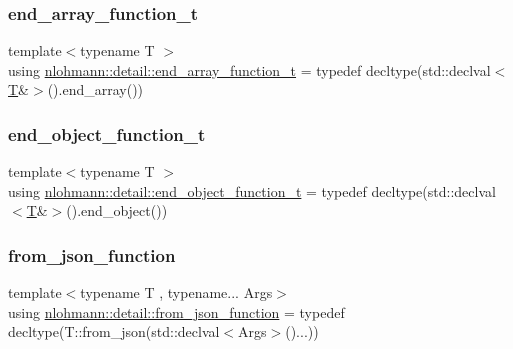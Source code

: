 \mbox{\label{namespacenlohmann_1_1detail_aec53c029383b34a72182210e58fadb79}} 
\subsubsection{\texorpdfstring{end\_array\_function\_t}{end\_array\_function\_t}}
{\footnotesize\ttfamily template$<$typename T $>$ \\
using \mbox{\hyperlink{namespacenlohmann_1_1detail_aec53c029383b34a72182210e58fadb79}{nlohmann\+::detail\+::end\+\_\+array\+\_\+function\+\_\+t}} = typedef decltype(std\+::declval$<$\mbox{\hyperlink{_keyboard_event_8h_adf1f3edb9115acb0a1e04209b7a9937b}{T}}\&$>$().end\+\_\+array())}

\mbox{\label{namespacenlohmann_1_1detail_af52d6d2521c386998ae940d118182ebc}} 
\subsubsection{\texorpdfstring{end\_object\_function\_t}{end\_object\_function\_t}}
{\footnotesize\ttfamily template$<$typename T $>$ \\
using \mbox{\hyperlink{namespacenlohmann_1_1detail_af52d6d2521c386998ae940d118182ebc}{nlohmann\+::detail\+::end\+\_\+object\+\_\+function\+\_\+t}} = typedef decltype(std\+::declval$<$\mbox{\hyperlink{_keyboard_event_8h_adf1f3edb9115acb0a1e04209b7a9937b}{T}}\&$>$().end\+\_\+object())}

\mbox{\label{namespacenlohmann_1_1detail_a1711ee5cef66a0523055c8d9f024f322}} 
\subsubsection{\texorpdfstring{from\_json\_function}{from\_json\_function}}
{\footnotesize\ttfamily template$<$typename T , typename... Args$>$ \\
using \mbox{\hyperlink{namespacenlohmann_1_1detail_a1711ee5cef66a0523055c8d9f024f322}{nlohmann\+::detail\+::from\+\_\+json\+\_\+function}} = typedef decltype(T\+::from\+\_\+json(std\+::declval$<$Args$>$()...))}

